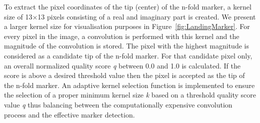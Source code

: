 \documentclass[conference]{IEEEtran}
\begin{document}
To extract the pixel coordinates of the tip (center) of the n-fold marker, a
kernel size of \SI{13}{}$\times$\SI{13}{} pixels consisting of a real and imaginary
part is created. We present a larger kernel size for visualisation purposes in Figure~\ref{fig:LandingMarker}.   For every pixel in the image, a convolution is
performed with this kernel and the magnitude of the convolution is
stored. The pixel with the highest magnitude is considered as a
candidate tip of the n-fold marker. For that candidate pixel only, 
an
overall normalized quality score \emph{q} between \SI{0.0}{} and \SI{1.0}{} is calculated. If
the score is above a desired threshold value then the pixel is
accepted as the tip of the n-fold marker. 
%
An adaptive kernel selection function is implemented to ensure the selection of a
proper minimum kernel size \emph{k} based on a threshold quality score value \emph{q} thus balancing between the computationally expensive convolution process and the effective marker detection.



\end{document}
